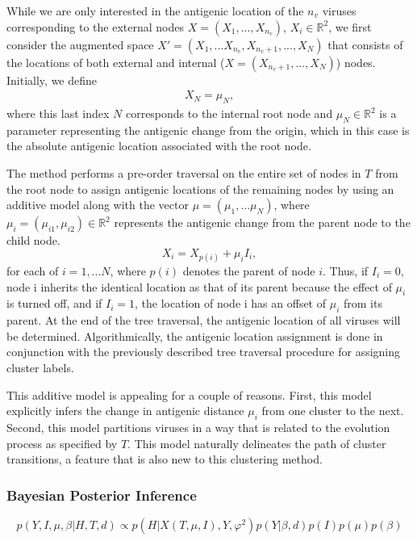 \documentclass[11pt,oneside,letterpaper]{article}
\newcommand{\mdssd}{\varphi}						%
\begin{document}
While we are only interested in the antigenic location of the $n_v$ viruses corresponding to the external nodes $X=(X_1,..., X_{n_{v}})$, $X_i \in \mathbb{R}^{2}$, we first consider the augmented space $X' = (X_1, ...X_{n_v}, X_{ n_v +1},..., X_N)$ that consists of the locations of both  external and internal ($X=(X_{n_v + 1},..., X_N)$) nodes.
Initially, we define
\begin{eqnarray}
 	X_{N} = \mu_N     ,
\end{eqnarray}
 where this last index $N$ corresponds to the internal root node and $\mu_N \in \mathbb{R}^{2}$ is a parameter representing the antigenic change from the origin, which in this case is the absolute antigenic location associated with the root node. 

The method performs a pre-order traversal on the entire set of nodes in $T$  from the root node to assign antigenic locations of the remaining nodes by using an additive model along with the vector $\mu = (\mu_1,...\mu_N)$, where $\mu_i = (\mu_{i1},  \mu_{i2}) \in \mathbb{R}^{2}$ represents the antigenic change from the parent node to the child node.
\begin{equation}
	X_i=  X_{p(i)} + \mu_i    I_i   		,
\end{equation}
for each of $i=1,... N$, where $p(i)$ denotes the parent of node $i$.
Thus, if $I_i=0$, node i inherits the identical location as that of its parent because the effect of $\mu_i$ is turned off, and if $I_i=1$, the location of node i has an offset of $\mu_i$ from its parent.
At the end of the tree traversal, the antigenic location of all viruses will be determined.
Algorithmically, the antigenic location assignment is done in conjunction with the previously described tree traversal procedure for assigning cluster labels.


This additive model is appealing for a couple of reasons.
First, this model explicitly infers the change in antigenic distance $\mu_i$ from one cluster to the next.
Second, this model partitions viruses in a way that is related to the evolution process as specified by $T$.
This model naturally delineates the path of cluster transitions, a feature that is also new to this clustering method.


\subsubsection*{Bayesian Posterior Inference}

\begin{equation}
  p(Y, I, \mu ,  \beta | H, T, d) \propto  p(H| X(T, \mu, I), Y , \mdssd^2) p(Y|  \beta, d) p(I) p(\mu) p(\beta)
\end{equation}
\end{document}
